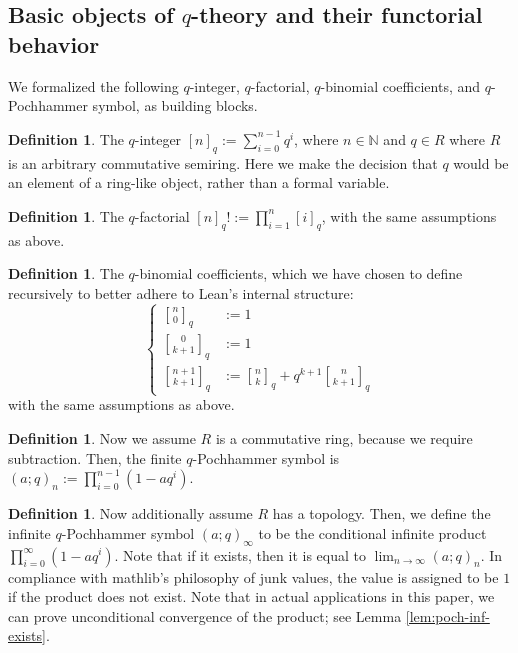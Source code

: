 \documentclass[12pt]{amsart}
\theoremstyle{definition}
\newtheorem{definition}[theorem]{Definition}
\theoremstyle{remark}
\numberwithin{equation}{subsection}
\newcommand{\N}{\mathbb N}
\newcommand{\qbinom}[3][q]{\genfrac{[}{]}{0pt}{}{#2}{#3}_{#1}}
\begin{document}
\subsection{Basic objects of \texorpdfstring{$q$}{q}-theory and their functorial behavior}

We formalized the following $q$-integer, $q$-factorial, $q$-binomial coefficients, and $q$-Pochhammer symbol, as building blocks.

\begin{definition}
    The $q$-integer $[n]_q := \sum_{i=0}^{n-1} q^i$, where $n \in \N$ and $q \in R$ where $R$ is an arbitrary commutative semiring. Here we make the decision that $q$ would be an element of a ring-like object, rather than a formal variable.
\end{definition}

\begin{definition}
    The $q$-factorial $[n]_q ! := \prod_{i=1}^n [i]_q$, with the same assumptions as above.
\end{definition}

\begin{definition}
    The $q$-binomial coefficients, which we have chosen to define recursively to better adhere to Lean's internal structure:
    \begin{equation}\begin{cases}
      \qbinom{n}{0} & := 1 \\
      \qbinom{0}{k+1} & := 1 \\
      \qbinom{n+1}{k+1} & := \qbinom{n}{k} + q^{k+1} \qbinom{n}{k+1}
    \end{cases}\end{equation}
    with the same assumptions as above.
\end{definition}

\begin{definition}
    Now we assume $R$ is a commutative ring, because we require subtraction. Then, the finite $q$-Pochhammer symbol is $(a; q)_n := \prod_{i=0}^{n-1} (1 - aq^i)$.
\end{definition}

\begin{definition}
    Now additionally assume $R$ has a topology. Then, we define the infinite $q$-Pochhammer symbol $(a; q)_\infty$ to be the conditional infinite product $\prod_{i=0}^{\infty} (1 - aq^i)$. Note that if it exists, then it is equal to $\lim_{n \to \infty} (a; q)_n$. In compliance with mathlib's philosophy of junk values, the value is assigned to be $1$ if the product does not exist. Note that in actual applications in this paper, we can prove unconditional convergence of the product; see Lemma \ref{lem:poch-inf-exists}.
\end{definition}
\end{document}
